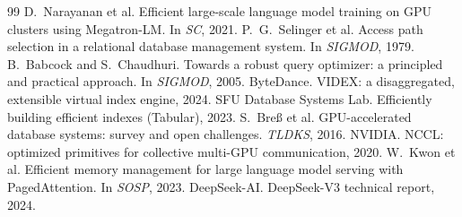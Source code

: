 \documentclass{article}
\begin{document}
\begin{thebibliography}{99}
 D.~Narayanan et al. Efficient large-scale
language model training on GPU clusters using Megatron-LM. In \emph{SC}, 2021.
 P.~G.~Selinger et al. Access path selection in a
relational database management system. In \emph{SIGMOD}, 1979.
 B.~Babcock and S.~Chaudhuri. Towards a robust query
optimizer: a principled and practical approach. In \emph{SIGMOD}, 2005.
 ByteDance. VIDEX: a disaggregated, extensible virtual index
engine, 2024.
 SFU Database Systems Lab. Efficiently building efficient
indexes (Tabular), 2023.
 S.~Bre\ss{} et al. GPU-accelerated database systems:
survey and open challenges. \emph{TLDKS}, 2016.
 NVIDIA. NCCL: optimized primitives for collective multi-GPU
communication, 2020.
 W.~Kwon et al. Efficient memory management for large
language model serving with PagedAttention. In \emph{SOSP}, 2023.
 DeepSeek-AI. DeepSeek-V3 technical report, 2024.
\end{thebibliography}
\end{document}
